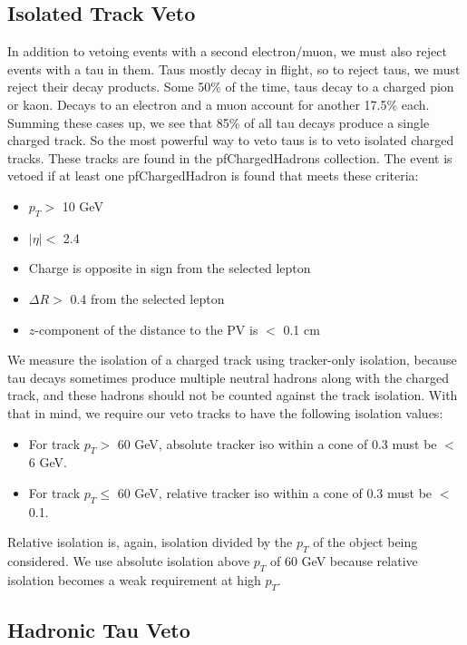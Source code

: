 \subsection{Isolated Track Veto}
\label{ssec:stop:isotrackveto}

In addition to vetoing events with a second electron/muon, we must
also reject events with a tau in them. Taus mostly decay in flight, so
to reject taus, we must reject their decay products. Some 50\% of the
time, taus decay to a charged pion or kaon. Decays to an electron and
a muon account for another 17.5\% each. Summing these cases up, we see
that 85\% of all tau decays produce a single charged track. So the
most powerful way to veto taus is to veto isolated charged
tracks. These tracks are found in the pfChargedHadrons collection. The
event is vetoed if at least one pfChargedHadron is found that meets these
criteria:
\begin{itemize}
\item $p_T >$ 10 GeV
\item $|\eta| <$ 2.4
\item Charge is opposite in sign from the selected lepton
\item $\Delta R >$ 0.4 from the selected lepton
\item $z$-component of the distance to the PV is $<$ 0.1 cm
\end{itemize}
We measure the isolation of a charged track using tracker-only
isolation, because tau decays sometimes produce multiple neutral
hadrons along with the charged track, and these hadrons should not be
counted against the track isolation. With that in mind, we require our
veto tracks to have the following isolation values:
\begin{itemize}
\item For track $p_T >$ 60 GeV, absolute tracker iso within a cone of
  0.3 must be $<$ 6 GeV.
\item For track $p_T \leq$ 60 GeV, relative tracker iso within a cone
  of 0.3 must be  $<$ 0.1.
\end{itemize}
Relative isolation is, again, isolation divided by the $p_T$ of the
object being considered. We use absolute isolation above $p_T$ of 60
GeV because relative isolation becomes a weak requirement at high
$p_T$.

\subsection{Hadronic Tau Veto}
\label{ssec:stop:hadtauveto}

